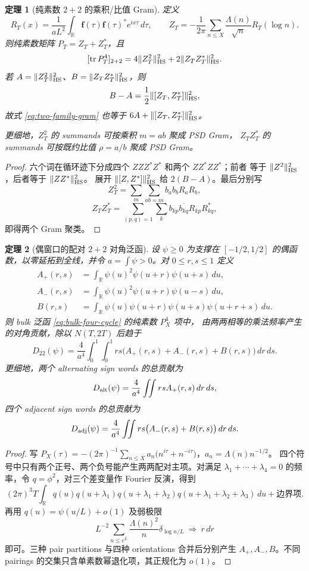 \documentclass[UTF8,11pt,a4paper]{ctexart}
\newtheorem{theorem}{定理}[section]
\theoremstyle{definition}
\theoremstyle{remark}
\newcommand{\tr}{\operatorname{tr}}
\begin{document}
\begin{theorem}[纯素数 $2+2$ 的乘积/比值 Gram]\label{thm:product-ratio-gram}
定义
\[
 R_T(x)=\frac1{aL^2}\int_{\mathbb R}
 \mathbf f(\tau)\mathbf f(\tau)^*e^{ix\tau}\,d\tau,
 \qquad
 Z_T=-\frac1{2\pi}\sum_{n\le X}\frac{\Lambda(n)}{\sqrt n}R_T(\log n).
\]
则纯素数矩阵 $P_T=Z_T+Z_T^*$，且
\[
 [\tr P_T^4]_{2+2}
 =4\|Z_T^2\|_{\rm HS}^2+2\|Z_TZ_T^*\|_{\rm HS}^2.
 \label{eq:two-family-gram}
\]
若 $A=\|Z_T^2\|_{\rm HS}^2$、$B=\|Z_TZ_T^*\|_{\rm HS}^2$，则
\[
 B-A=\frac12\|[Z_T,Z_T^*]\|_{\rm HS}^2,
\]
故式 \eqref{eq:two-family-gram} 也等于
$6A+\|[Z_T,Z_T^*]\|_{\rm HS}^2$。

更细地，$Z_T^2$ 的 summands 可按乘积 $m=ab$ 聚成 PSD Gram，
$Z_TZ_T^*$ 的 summands 可按既约比值 $\rho=a/b$ 聚成 PSD Gram。
\end{theorem}

\begin{proof}
六个词在循环迹下分成四个 $ZZZ^*Z^*$ 和两个 $ZZ^*ZZ^*$；前者
等于 $\|Z^2\|_{\rm HS}^2$，后者等于 $\|ZZ^*\|_{\rm HS}^2$。
展开 $\|[Z,Z^*]\|_{\rm HS}^2$ 给 $2(B-A)$。最后分别写
\[
 Z_T^2=\sum_m\sum_{ab=m}b_ab_bR_aR_b,
\]
\[
 Z_TZ_T^*=\sum_{(p,q)=1}\sum_k
 b_{kp}\overline{b_{kq}}R_{kp}R_{kq}^*,
\]
即得两个 Gram 聚类。
\end{proof}

\begin{theorem}[偶窗口的配对 $2+2$ 对角泛函]
\label{thm:paired-window}
设 $\psi\ge0$ 为支撑在 $[-1/2,1/2]$ 的偶函数，以零延拓到全线，并令
$a=\int\psi>0$。对 $0\le r,s\le1$ 定义
\begin{align*}
 A_+(r,s)&=\int_{\mathbb R}\psi(u)^2\psi(u+r)\psi(u+s)\,du,\\
 A_-(r,s)&=\int_{\mathbb R}\psi(u)^2\psi(u+r)\psi(u-s)\,du,\\
 B(r,s)&=\int_{\mathbb R}\psi(u)\psi(u+r)\psi(u+s)\psi(u+r+s)\,du.
\end{align*}
则 bulk 泛函 \eqref{eq:bulk-four-cycle} 的纯素数 $P_X^4$ 项中，
由两两相等的乘法频率产生的对角贡献，除以 $N(T,2T)$ 后趋于
\[
 D_{22}(\psi)
 =\frac4{a^4}\int_0^1\!\!\int_0^1
 rs\bigl(A_+(r,s)+A_-(r,s)+B(r,s)\bigr)\,dr\,ds.
 \label{eq:paired-window-functional}
\]
更细地，两个 alternating sign words 的总贡献为
\[
 D_{\rm alt}(\psi)=\frac4{a^4}\iint rsA_+(r,s)\,dr\,ds,
\]
四个 adjacent sign words 的总贡献为
\[
 D_{\rm adj}(\psi)=\frac4{a^4}\iint
 rs\bigl(A_-(r,s)+B(r,s)\bigr)\,dr\,ds.
\]
\end{theorem}

\begin{proof}
写
$P_X(\tau)=-(2\pi)^{-1}\sum_{n\le X}a_n
\bigl(n^{i\tau}+n^{-i\tau}\bigr)$，$a_n=\Lambda(n)n^{-1/2}$。
四个符号中只有两个正号、两个负号能产生两两配对主项。对满足
$\lambda_1+\cdots+\lambda_4=0$ 的频率，令
$q=\phi^2$，对三个差变量作 Fourier 反演，得到
\[
 (2\pi)^3T\int_{\mathbb R}
 q(u)q(u+\lambda_1)q(u+\lambda_1+\lambda_2)
 q(u+\lambda_1+\lambda_2+\lambda_3)\,du
+\text{边界项}.
\]
再用 $q(u)=\psi(u/L)+o(1)$ 及弱极限
\[
 L^{-2}\sum_{n\le e^L}\frac{\Lambda(n)^2}{n}
 \delta_{\log n/L}\ \Longrightarrow\ r\,dr
\]
即可。三种 pair partitions 与四种 orientations 合并后分别产生
$A_+,A_-,B$。不同 pairings 的交集只含单素数幂退化项，其正规化为
$o(1)$。
\end{proof}
\end{document}
